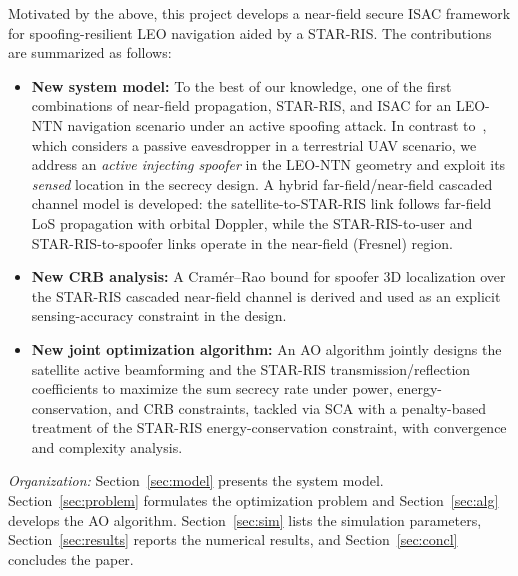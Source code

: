Motivated by the above, this project develops a near-field secure ISAC framework for spoofing-resilient LEO navigation aided by a STAR-RIS. The contributions are summarized as follows:
\begin{itemize}[leftmargin=1.5em]
    \item \textbf{New system model:} To the best of our knowledge, one of the first combinations of near-field propagation, STAR-RIS, and ISAC for an LEO-NTN navigation scenario under an active spoofing attack. In contrast to~\cite{zhao2025nearfield}, which considers a passive eavesdropper in a terrestrial UAV scenario, we address an \emph{active injecting spoofer} in the LEO-NTN geometry and exploit its \emph{sensed} location in the secrecy design. A hybrid far-field/near-field cascaded channel model is developed: the satellite-to-STAR-RIS link follows far-field LoS propagation with orbital Doppler, while the STAR-RIS-to-user and STAR-RIS-to-spoofer links operate in the near-field (Fresnel) region.
    \item \textbf{New CRB analysis:} A Cram\'er--Rao bound for spoofer 3D localization over the STAR-RIS cascaded near-field channel is derived and used as an explicit sensing-accuracy constraint in the design.
    \item \textbf{New joint optimization algorithm:} An AO algorithm jointly designs the satellite active beamforming and the STAR-RIS transmission/reflection coefficients to maximize the sum secrecy rate under power, energy-conservation, and CRB constraints, tackled via SCA with a penalty-based treatment of the STAR-RIS energy-conservation constraint, with convergence and complexity analysis.
\end{itemize}

\emph{Organization:} Section~\ref{sec:model} presents the system model. Section~\ref{sec:problem} formulates the optimization problem and Section~\ref{sec:alg} develops the AO algorithm. Section~\ref{sec:sim} lists the simulation parameters, Section~\ref{sec:results} reports the numerical results, and Section~\ref{sec:concl} concludes the paper.
